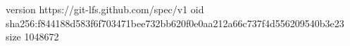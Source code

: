 version https://git-lfs.github.com/spec/v1
oid sha256:f844188d583f6f703471bee732bb620f0e0aa212a66c737f4d556209540b3e23
size 1048672
